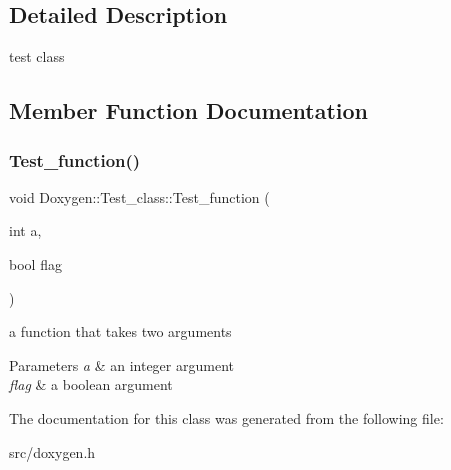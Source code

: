 \subsection{Detailed Description}
test class 

\subsection{Member Function Documentation}
\hypertarget{class_doxygen_1_1_test__class_addda983da64aaea92ea327f1f2db1a9c}{}\label{class_doxygen_1_1_test__class_addda983da64aaea92ea327f1f2db1a9c} 
\subsubsection{\texorpdfstring{Test\+\_\+function()}{Test\_function()}}
{\footnotesize\ttfamily void Doxygen\+::\+Test\+\_\+class\+::\+Test\+\_\+function (\begin{DoxyParamCaption}\item[{int}]{a,  }\item[{bool}]{flag }\end{DoxyParamCaption})\hspace{0.3cm}{\ttfamily [inline]}}



a function that takes two arguments 


\begin{DoxyParams}{Parameters}
{\em a} & an integer argument \\
\hline
{\em flag} & a boolean argument \\
\hline
\end{DoxyParams}


The documentation for this class was generated from the following file\+:\begin{DoxyCompactItemize}
\item 
src/doxygen.\+h\end{DoxyCompactItemize}
